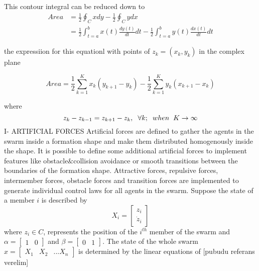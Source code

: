 \documentclass[twoside]{article}
\begin{document}
\begin{multicols}{2}
	This contour integral can be reduced down to
	\begin{align*}
Area &= \frac{1}{2} \oint_C xdy - \frac{1}{2} \oint_C ydx \\
&= \frac{1}{2} \int_{t=a}^{b} x(t)\frac{dy(t)}{dt}dt - \frac{1}{2} \int_{t=a}^{b}y(t)\frac{dx(t)}{dt}dt
	\end{align*}
		
			the expressiion for this equationl with points of  $z_k = (x_k,y_k)$ in the complex plane
			
			\begin{equation}
       Area = \frac{1}{2} \sum_{k=1}^{K} x_k(y_{k+1} - y_k) - \frac{1}{2} \sum_{k=1}^{K}y_k(x_{k+1} - x_k)
			\end{equation}
			
				where
				\begin{equation}
				z_k - z_{k-1} = z_{k+1} - z_k, \hspace{0.2cm}  \forall k ;  \hspace{0.2cm} when  \hspace{0.2cm} K \to\infty
				\end{equation}
			I- ARTIFICIAL FORCES
			Artificial forces are defined to gather the agents in the swarm inside a formation shape and make them distributed homogenously inside the shape. It is possible to define some additional artificial forces to implement features like obstacle$\&$collision avoidance or smooth transitions between the boundaries of the formation shape. Attractive forces, repulsive forces, intermember forces, obstacle forces and transition forces are implemented to generate individual control laws for all agents in the swarm. Suppose the state of a member $i$ is described by
			\begin{equation}
X_i = \begin{bmatrix}
z_i\\ \dot{z}_i
\end{bmatrix}
			\end{equation}
			where  $z_i \in C$, represents the position of the $i^{th}$ member of the swarm and $\alpha = \begin{bmatrix}
1 & 0
			\end{bmatrix}$ and $\beta = \begin{bmatrix}
0 & 1
			\end{bmatrix}$. The state of the whole swarm $x= \begin{bmatrix}
X_1 & X_2 & ... X_n
			\end{bmatrix}$ is determined by the linear equations of [pubudu referans verelim]

\end{multicols}
\end{document}
